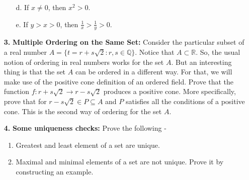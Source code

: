 \begin{enumerate}[label=\textbf{\arabic*.}]
\begin{enumerate}
        \item[d.] If $x\neq0$, then $x^2>0$.
        \item[e.] If $y>x>0$, then $\frac{1}{x}>\frac{1}{y}>0$.
    \end{enumerate}
    \item[\textbf{3.}] \textbf{Multiple Ordering on the Same Set:} Consider the particular subset of a real number $A=\{t=r+s\sqrt{2}:r,s\in\mathbb{Q}\}$. Notice that $A\subset\mathbb{R}$. So, the usual notion of ordering in real numbers works for the set $A$. But an interesting thing is that the set $A$ can be ordered in a different way. For that, we will make use of the positive cone definition of an ordered field. Prove that the function $f:r+s\sqrt{2}\to r-s\sqrt{2}$ produces a positive cone\footnotemark. More specifically, prove that for $r-s\sqrt{2}\in P\subseteq A$ and $P$ satisfies all the conditions of a positive cone. This is the second way of ordering for the set $A$.
    \item[\textbf{4.}] \textbf{Some uniqueness checks:} Prove the following -
    \begin{enumerate}
        \item Greatest and least element of a set are unique.
        \item Maximal and minimal elements of a set are not unique. Prove it by constructing an example.
    \end{enumerate}
\end{enumerate}
